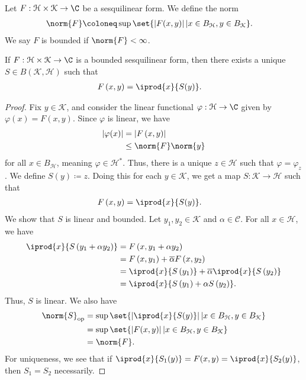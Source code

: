 \documentclass[10pt]{mypackage}
\begin{document}
\begin{definition}
  Let $F: \mathcal{H}\times \mathcal{K}\rightarrow \C$ be a sesquilinear form. We define the norm
  \begin{align*}
    \norm{F} &\coloneq \sup\set{\left\vert F(x,y) \right\vert | x\in B_{\mathcal{H}},y\in B_{\mathcal{K}}}.
  \end{align*}
  We say $F$ is bounded if $\norm{F} < \infty $.
\end{definition}
\begin{proposition}
  If $F: \mathcal{H}\times \mathcal{K}\rightarrow \C$ is a bounded sesquilinear form, then there exists a unique $S\in B\left(\mathcal{K},\mathcal{H}\right)$ such that
  \begin{align*}
    F\left(x,y\right) &= \iprod{x}{S(y)}.
  \end{align*}
\end{proposition}
\begin{proof}
Fix $y\in \mathcal{K}$, and consider the linear functional $\varphi: \mathcal{H}\rightarrow \C$ given by $\varphi(x) = F\left(x,y\right)$. Since $\varphi$ is linear, we have
\begin{align*}
  \left\vert \varphi(x) \right\vert &= \left\vert F\left(x,y\right) \right\vert\\
                                    &\leq \norm{F}\norm{y}
\end{align*}
for all $x\in B_{\mathcal{H}}$, meaning $\varphi\in \mathcal{H}^{\ast}$. Thus, there is a unique $z\in \mathcal{H}$ such that $\varphi = \varphi_z$. We define $S(y) \coloneq z$. Doing this for each $y\in \mathcal{K}$, we get a map $S: \mathcal{K}\rightarrow \mathcal{H}$ such that
\begin{align*}
  F\left(x,y\right) &= \iprod{x}{S(y)}.
\end{align*}
We show that $S$ is linear and bounded. Let $y_1,y_2\in \mathcal{K}$ and $\alpha \in \mathcal{C}$. For all $x\in \mathcal{H}$, we have
\begin{align*}
  \iprod{x}{S\left(y_1 + \alpha y_2\right)} &= F\left(x,y_1 + \alpha y_2\right)\\
                                            &= F\left(x,y_1\right) + \overline{\alpha}F\left(x,y_2\right)\\
                                            &= \iprod{x}{S\left(y_1\right)} + \overline{\alpha} \iprod{x}{S\left(y_2\right)}\\
                                            &= \iprod{x}{S\left(y_1\right) + \alpha S\left(y_2\right)}.
\end{align*}
Thus, $S$ is linear. We also have
\begin{align*}
  \norm{S}_{\text{op}} &= \sup\set{\left\vert \iprod{x}{S(y)} \right\vert | x\in B_{\mathcal{H}},y\in B_{\mathcal{K}}}\\
                       &= \sup\set{\left\vert F(x,y) \right\vert | x\in B_{\mathcal{H}},y\in B_{\mathcal{K}}}\\
                       &= \norm{F}.
\end{align*}
For uniqueness, we see that if $ \iprod{x}{S_1(y)} = F(x,y) = \iprod{x}{S_2(y)} $, then $S_1 = S_2$ necessarily.
\end{proof}
\end{document}
